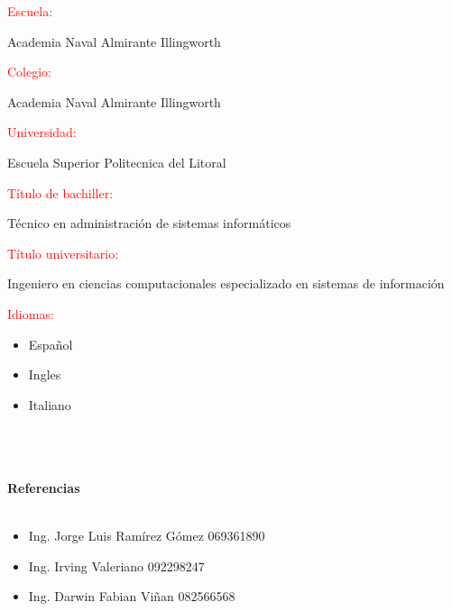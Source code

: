 \documentclass[20pt]{article}
\begin{document}
\begin{large}
\textcolor{red}{Escuela:}
\end{large}
Academia Naval Almirante Illingworth\\

\begin{large}
\textcolor{red}{Colegio:}
\end{large}
Academia Naval Almirante Illingworth\\

\begin{large}
\textcolor{red}{Universidad:}
\end{large}
Escuela Superior Politecnica del Litoral\\

\begin{large}
\textcolor{red}{Título de bachiller:}
\end{large}
Técnico en administración de sistemas informáticos\\

\begin{large}
\textcolor{red}{Título universitario:}
\end{large}
Ingeniero en ciencias computacionales especializado en sistemas de información\\

\begin{large}
\textcolor{red}{Idiomas:}
\end{large}
\begin{itemize}
\item Español
\item Ingles
\item Italiano\\\\\\\\
\end{itemize}

\begin{center}
\begin{huge}
\textbf{Referencias}\\\
\end{huge}
\end{center}

\begin{itemize}
\item Ing. Jorge Luis Ramírez Gómez 		069361890
\item Ing. Irving Valeriano			092298247
\item Ing. Darwin Fabian Viñan 		082566568
\end{itemize}
\end{document}

